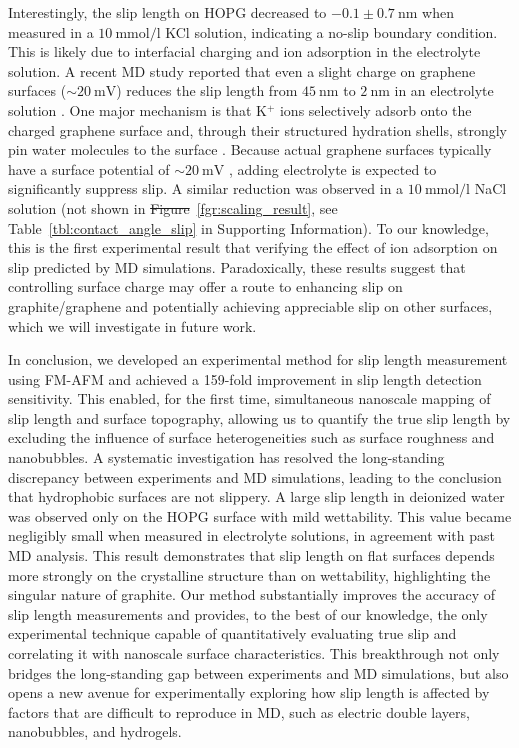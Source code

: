 \documentclass[journal=jacsat,manuscript=article]{achemso}
\providecommand{\DIFadd}[1]{{\protect\color{blue}\uwave{#1}}} %
\providecommand{\DIFdel}[1]{{\protect\color{red}\sout{#1}}} %
\providecommand{\DIFaddbegin}{} %
\providecommand{\DIFaddend}{} %
\providecommand{\DIFdelbegin}{} %
\providecommand{\DIFdelend}{} %
\newcommand{\DIFscaledelfig}{0.5}
\newlength{\DIFdelgraphicswidth} %
\newlength{\DIFdelgraphicsheight} %
\newcommand{\DIFaddincludegraphics}[2][]{{\color{blue}\fbox{\DIFOincludegraphics[#1]{#2}}}} %
\newcommand{\DIFdelincludegraphics}[2][]{%
\sbox{\DIFdelgraphicsbox}{\DIFOincludegraphics[#1]{#2}}%
\settoboxwidth{\DIFdelgraphicswidth}{\DIFdelgraphicsbox} %
\settoboxtotalheight{\DIFdelgraphicsheight}{\DIFdelgraphicsbox} %
\scalebox{\DIFscaledelfig}{%
\parbox[b]{\DIFdelgraphicswidth}{\usebox{\DIFdelgraphicsbox}\\[-\baselineskip] \rule{\DIFdelgraphicswidth}{0em}}\llap{\resizebox{\DIFdelgraphicswidth}{\DIFdelgraphicsheight}{%
\setlength{\unitlength}{\DIFdelgraphicswidth}%
\begin{picture}(1,1)%
\thicklines\linethickness{2pt} %
{\color[rgb]{1,0,0}\put(0,0){\framebox(1,1){}}}%
{\color[rgb]{1,0,0}\put(0,0){\line( 1,1){1}}}%
{\color[rgb]{1,0,0}\put(0,1){\line(1,-1){1}}}%
\end{picture}%
}\hspace*{3pt}}} %
} %
\DeclareRobustCommand{\DIFaddbegin}{\DIFOaddbegin \let\includegraphics\DIFaddincludegraphics} %
\DeclareRobustCommand{\DIFaddend}{\DIFOaddend \let\includegraphics\DIFOincludegraphics} %
\DeclareRobustCommand{\DIFdelbegin}{\DIFOdelbegin \let\includegraphics\DIFdelincludegraphics} %
\DeclareRobustCommand{\DIFdelend}{\DIFOaddend \let\includegraphics\DIFOincludegraphics} %
\begin{document}
Interestingly, the slip length on HOPG decreased to \(-0.1 \pm \SI{0.7}{\nano\metre}\) when measured in a \(\SI{10}{\milli\mole\per\litre}\) KCl solution, indicating a no-slip boundary condition. This is likely due to interfacial charging and ion adsorption in the electrolyte solution. A recent MD study reported that even a slight charge on graphene surfaces (\(\sim\SI{20}{\milli\volt}\)) reduces the slip length from \(\SI{45}{\nano\metre}\) to \(\SI{2}{\nano\metre}\) in an electrolyte solution \cite{Xie2020-as}. One major mechanism is that K\(^+\) ions selectively adsorb onto the charged graphene surface and, through their structured hydration shells, strongly pin water molecules to the surface \cite{Mu2021-wm}. Because actual graphene surfaces typically have a surface potential of \(\sim\SI{20}{\milli\volt}\) \cite{Paruchuri2004-iu}, adding electrolyte is expected to significantly suppress slip. A similar reduction was observed in a \(\SI{10}{\milli\mole\per\litre}\) NaCl solution (not shown in \DIFdelbegin \DIFdel{Figure}\DIFdelend \DIFaddbegin \DIFadd{Fig.}\DIFaddend ~\ref{fgr:scaling_result}, see Table~\ref{tbl:contact_angle_slip} in Supporting Information). To our knowledge, this is the first experimental result that verifying the effect of ion adsorption on slip predicted by MD simulations. Paradoxically, these results suggest that controlling surface charge may offer a route to enhancing slip on graphite/graphene and potentially achieving appreciable slip on other surfaces, which we will investigate in future work.

In conclusion, we developed an experimental method for slip length measurement using FM-AFM and achieved a 159-fold improvement in slip length detection sensitivity. This enabled, for the first time, simultaneous nanoscale mapping of slip length and surface topography, allowing us to quantify the true slip length by excluding the influence of surface heterogeneities such as surface roughness and nanobubbles. A systematic investigation has resolved the long-standing discrepancy between experiments and MD simulations, leading to the conclusion that hydrophobic surfaces are not slippery. A large slip length in deionized water was observed only on the HOPG surface with mild wettability. This value became negligibly small when measured in electrolyte solutions, in agreement with past MD analysis. This result demonstrates that slip length on flat surfaces depends more strongly on the crystalline structure than on wettability, highlighting the singular nature of graphite. Our method substantially improves the accuracy of slip length measurements and provides, to the best of our knowledge, the only experimental technique capable of quantitatively evaluating true slip and correlating it with nanoscale surface characteristics. This breakthrough not only bridges the long-standing gap between experiments and MD simulations, but also opens a new avenue for experimentally exploring how slip length is affected by factors that are difficult to reproduce in MD, such as electric double layers, nanobubbles, and hydrogels. 
\end{document}

